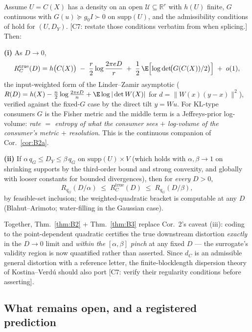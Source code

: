 \begin{theorem}
\label{thm:B3}
Assume $U=C(X)$ has a density on an open $\mathcal{U}\subseteq\mathbb{R}^r$
with $h(U)$ finite, $G$ continuous with $G(u)\succeq g_0 I\succ0$ on
$\mathrm{supp}(U)$, and the admissibility conditions of
\cite{LinderZamir99} hold for $(U, D_Y)$. \textup{[C7: restate those
conditions verbatim from \cite{LinderZamir99} when splicing.]} Then:

\smallskip\noindent\textbf{(i)}\; As $D\to0$,
\[
R_C^{\mathrm{true}}(D)
= h\bigl(C(X)\bigr)\;-\;\frac{r}{2}\log\frac{2\pi e D}{r}
\;+\;\frac12\,\E\Bigl[\log\det\!\bigl(G(C(X))/2\bigr)\Bigr]\;+\;o(1),
\]
the input-weighted form of the Linder--Zamir asymptotic
($R(D)=h(X)-\tfrac{n}{2}\log\tfrac{2\pi e D}{n}+\E\log|\det W(X)|$
for $d=\|W(x)(y-x)\|^2$), verified against the fixed-$G$ case by the direct
tilt $y=Wu$. For KL-type consumers $G$ is the Fisher metric and the middle
term is a Jeffreys-prior log-volume: \emph{rate $=$ entropy of what the
consumer sees $+$ log-volume of the consumer's metric $+$ resolution}. This is
the continuous companion of Cor.~\ref{cor:B2a}.

\smallskip\noindent\textbf{(ii)}\; If $\alpha\, q_G\le D_Y\le \beta\, q_G$ on
$\mathrm{supp}(U)\times V$ (which holds with $\alpha,\beta\to1$ on shrinking
supports by the third-order bound and strong convexity, and globally with
looser constants for bounded divergences), then for \emph{every} $D>0$,
\[
R_{q_G}(D/\alpha)\;\le\;R_C^{\mathrm{true}}(D)\;\le\;R_{q_G}(D/\beta),
\]
by feasible-set inclusion; the weighted-quadratic bracket is computable at any
$D$ (Blahut--Arimoto; water-filling in the Gaussian case).
\end{theorem}

\begin{remark}
Together, Thm.~\ref{thm:B2} $+$ Thm.~\ref{thm:B3} replace Cor.~2's caveat
(iii): coding to the point-dependent quadratic certifies the true downstream
distortion \emph{exactly} in the $D\to0$ limit and \emph{within the
$[\alpha,\beta]$ pinch} at any fixed $D$ --- the surrogate's validity region is
now quantified rather than asserted. Since $d_C$ is an admissible general
distortion with a reference letter, the finite-blocklength dispersion theory of
Kostina--Verd\'u should also port \textup{[C7: verify their regularity
conditions before asserting]}.
\end{remark}

\subsection{What remains open, and a registered prediction}


